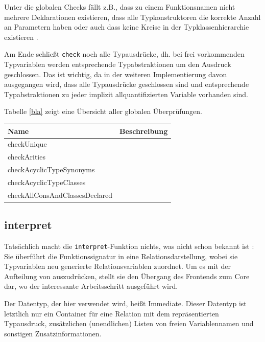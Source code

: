 Unter die globalen Checks fällt z.B., dass zu einem Funktionsnamen nicht mehrere Deklarationen existieren, dass alle Typkonstruktoren die korrekte Anzahl an Parametern haben oder auch dass keine Kreise in der Typklassenhierarchie existieren \cite{freetheorems}.

Am Ende schließt \texttt{check} noch alle Typausdrücke, dh. bei frei vorkommenden Typvariablen werden entsprechende Typabstraktionen um den Ausdruck geschlossen. Das ist wichtig, da in der weiteren Implementierung davon ausgegangen wird, dass alle Typausdrücke geschlossen sind und entsprechende Typabstraktionen zu jeder implizit allquantifizierten Variable vorhanden sind.

Tabelle \ref{bla} zeigt eine Übersicht aller globalen Überprüfungen.

\begin{tabular}{| l | l |}
\hline
Name&Beschreibung\\
\hline
  checkUnique&\\
  checkArities&\\
  checkAcyclicTypeSynonyms&\\
  checkAcyclicTypeClasses&\\
  checkAllConsAndClassesDeclared&\\
\hline
\end{tabular}


\subsection{interpret}

Tatsächlich macht die \texttt{interpret}-Funktion nichts, was nicht schon bekannt ist : Sie überführt die Funktionssignatur in eine
Relationsdarstellung, wobei sie Typvariablen neu generierte Relationsvariablen zuordnet. Um es mit der Aufteilung von \cite{freetheorems} auszudrücken, stellt sie den Übergang des Frontends zum Core dar, wo der interessante Arbeitsschritt ausgeführt wird.

Der Datentyp, der hier verwendet wird, heißt Immediate. Dieser Datentyp ist letztlich nur ein Container für eine Relation mit
dem repräsentierten Typausdruck, zusätzlichen (unendlichen) Listen von freien Variablennamen und sonstigen Zusatzinformationen.


